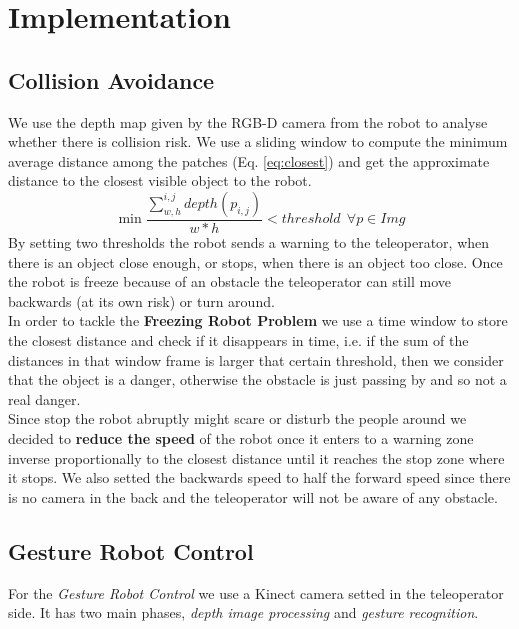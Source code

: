 \section{Implementation}
\label{sec:implementation}

\subsection{Collision Avoidance}
We use the depth map given by the RGB-D camera from the robot to analyse whether there is collision risk. We use a sliding window to compute the minimum average distance among the patches (Eq. \ref{eq:closest}) and get the approximate distance to the closest visible object to the robot. 
\begin{equation}\label{eq:closest}
\min\frac{\sum_{w,h}^{i,j}depth(p_{i,j})}{w*h} < threshold\ \ \forall p \in Img
\end{equation}
By setting two thresholds the robot sends a warning to the teleoperator, when there is an object close enough, or stops, when there is an object too close. Once the robot is freeze because of an obstacle the teleoperator can still move backwards (at its own risk) or turn around. \\

In order to tackle the \textbf{Freezing Robot Problem} we use a time window to store the closest distance and check if it disappears in time, i.e. if the sum of the distances in that window frame is larger that certain threshold, then we consider that the object is a danger, otherwise the obstacle is just passing by and so not a real danger.\\

Since stop the robot abruptly might scare or disturb the people around we decided to \textbf{reduce the speed} of the robot once it enters to a warning zone inverse proportionally to the closest distance until it reaches the stop zone where it stops. We also setted the backwards speed to half the forward speed since there is no camera in the back and the teleoperator will not be aware of any obstacle. \\

\subsection{Gesture Robot Control}
For the \emph{Gesture Robot Control} we use a Kinect camera setted in the teleoperator side. It has two main phases, \emph{depth image processing} and \emph{gesture recognition}.\\

